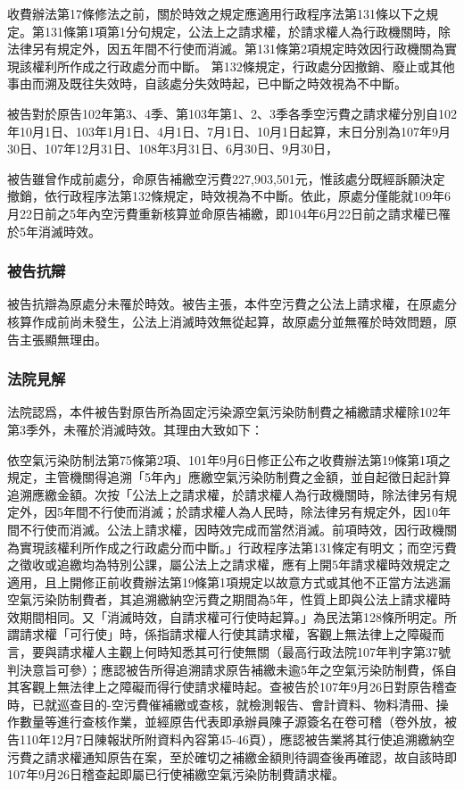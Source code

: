 \documentclass[11pt,a4paper]{article}
\begin{document}
收費辦法第17條修法之前，關於時效之規定應適用行政程序法第131條以下之規定。第131條第1項第1分句規定，公法上之請求權，於請求權人為行政機關時，除法律另有規定外，因五年間不行使而消滅。第131條第2項規定時效因行政機關為實現該權利所作成之行政處分而中斷。 第132條規定，行政處分因撤銷、廢止或其他事由而溯及既往失效時，自該處分失效時起，已中斷之時效視為不中斷。

被告對於原告102年第3、4季、第103年第1、2、3季各季空污費之請求權分別自102年10月1日、103年1月1日、4月1日、7月1日、10月1日起算，末日分別為107年9月30日、107年12月31日、108年3月31日、6月30日、9月30日，

被告雖曾作成前處分，命原告補繳空污費227,903,501元，惟該處分既經訴願決定撤銷，依行政程序法第132條規定，時效視為不中斷。依此，原處分僅能就109年6月22日前之5年內空污費重新核算並命原告補繳，即104年6月22日前之請求權已罹於5年消滅時效。

\subsubsection{被告抗辯}

被告抗辯為原處分未罹於時效。被告主張，本件空污費之公法上請求權，在原處分核算作成前尚未發生，公法上消滅時效無從起算，故原處分並無罹於時效問題，原告主張顯無理由。


\subsubsection{法院見解}
法院認爲，本件被告對原告所為固定污染源空氣污染防制費之補繳請求權除102年第3季外，未罹於消滅時效。其理由大致如下：

依空氣污染防制法第75條第2項、101年9月6日修正公布之收費辦法第19條第1項之規定，主管機關得追溯「5年內」應繳空氣污染防制費之金額，並自起徵日起計算追溯應繳金額。次按「公法上之請求權，於請求權人為行政機關時，除法律另有規定外，因5年間不行使而消滅；於請求權人為人民時，除法律另有規定外，因10年間不行使而消滅。公法上請求權，因時效完成而當然消滅。前項時效，因行政機關為實現該權利所作成之行政處分而中斷。」行政程序法第131條定有明文；而空污費之徵收或追繳均為特別公課，屬公法上之請求權，應有上開5年請求權時效規定之適用，且上開修正前收費辦法第19條第1項規定以故意方式或其他不正當方法逃漏空氣污染防制費者，其追溯繳納空污費之期間為5年，性質上即與公法上請求權時效期間相同。又「消滅時效，自請求權可行使時起算。」為民法第128條所明定。所謂請求權「可行使」時，係指請求權人行使其請求權，客觀上無法律上之障礙而言，要與請求權人主觀上何時知悉其可行使無關（最高行政法院107年判字第37號判決意旨可參）；應認被告所得追溯請求原告補繳未逾5年之空氣污染防制費，係自其客觀上無法律上之障礙而得行使請求權時起。查被告於107年9月26日對原告稽查時，已就巡查目的-空污費催補繳或查核，就檢測報告、會計資料、物料清冊、操作數量等進行查核作業，並經原告代表即承辦員陳子源簽名在卷可稽（卷外放，被告110年12月7日陳報狀所附資料內容第45-46頁），應認被告業將其行使追溯繳納空污費之請求權通知原告在案，至於確切之補繳金額則待調查後再確認，故自該時即107年9月26日稽查起即屬已行使補繳空氣污染防制費請求權。
\end{document}
